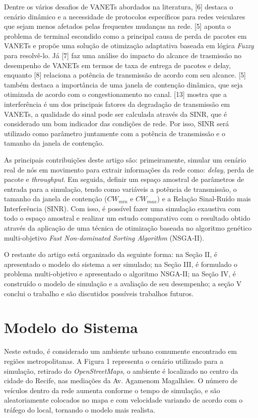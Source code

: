\documentclass[conference]{IEEEtran}
\begin{document}
Dentre os vários desafios de VANETs abordados na literatura, [6] destaca o cenário dinâmico e a necessidade de protocolos específicos para redes veiculares que sejam menos afetados pelas frequentes mudanças na rede. [5] aponta o problema de terminal escondido como a principal causa de perda de pacotes em VANETs e propõe uma solução de otimização adaptativa baseada em lógica \textit{Fuzzy} para resolvê-lo. Já [7] faz uma análise do impacto do alcance de trasmissão no desempenho de VANETs em termos de taxa de entrega de pacotes e delay, enquanto [8] relaciona a potência de transmissão de acordo com seu alcance. [5] também destaca a importância de uma janela de contenção dinâmica, que seja otimizada de acordo com o congestionamento no canal. [13] mostra que a interferência é um dos principais fatores da degradação de transmissão em VANETs, a qualidade do sinal pode ser calculada através da SINR, que é considerado um bom indicador das condições de rede. Por isso, SINR será utilizado como parâmetro juntamente com a potência de transmissão e o tamanho da janela de contenção.

As principais contribuições deste artigo são: primeiramente, simular um cenário real de nós em movimento para extrair informações da rede como: \textit{delay}, perda de pacote e \textit{throughput}. Em seguida, definir um espaço amostral de parâmetros de entrada para a simulação, tendo como variáveis a potência de transmissão, o tamanho da janela de contenção ($CW_{min}$ e $CW_{max}$) e a Relação Sinal-Ruído mais Interferência (SINR). Com isso, é possível fazer uma simulação exaustiva com todo o espaço amostral e realizar um estudo comparativo com o resultado obtido através da aplicação de uma técnica de otimização baseada no algoritmo genético multi-objetivo \textit{Fast Non-dominated Sorting Algorithm} (NSGA-II).

O restante do artigo está organizado da seguinte forma: na Seção II, é apresentado o modelo do sistema a ser simulado; na Seção III, é formulado o problema multi-objetivo e apresentado o algoritmo NSGA-II; na Seção IV, é construído o modelo de simulação e a avaliação de seu desempenho; a seção V conclui o trabalho e são discutidos possíveis trabalhos futuros.

\section{Modelo do Sistema}

Neste estudo, é considerado um ambiente urbano comumente encontrado em regiões metropolitanas. A Figura 1 representa o cenário utilizado para a simulação, retirado do \textit{OpenStreetMaps}, o ambiente é localizado no centro da cidade do Recife, nas mediações da Av. Agamenom Magalhães. O número de veículos dentro da rede aumenta conforme o tempo de simulação, e são aleatoriamente colocados no mapa e com velocidade variando de acordo com o tráfego do local, tornando o modelo mais realista. 
\end{document}
